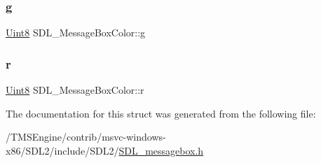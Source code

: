 \mbox{\label{struct_s_d_l___message_box_color_a5820adab0b32aa3eade101ea36ed6b4a}} 
\subsubsection{\texorpdfstring{g}{g}}
{\footnotesize\ttfamily \hyperlink{_s_d_l__stdinc_8h_a2944638813a090aa23e62f4da842c3e2}{Uint8} S\+D\+L\+\_\+\+Message\+Box\+Color\+::g}

\mbox{\label{struct_s_d_l___message_box_color_a43ab2172c10058380fcf67ecc3f53184}} 
\subsubsection{\texorpdfstring{r}{r}}
{\footnotesize\ttfamily \hyperlink{_s_d_l__stdinc_8h_a2944638813a090aa23e62f4da842c3e2}{Uint8} S\+D\+L\+\_\+\+Message\+Box\+Color\+::r}



The documentation for this struct was generated from the following file\+:\begin{DoxyCompactItemize}
\item 
/\+T\+M\+S\+Engine/contrib/msvc-\/windows-\/x86/\+S\+D\+L2/include/\+S\+D\+L2/\hyperlink{_s_d_l__messagebox_8h}{S\+D\+L\+\_\+messagebox.\+h}\end{DoxyCompactItemize}
